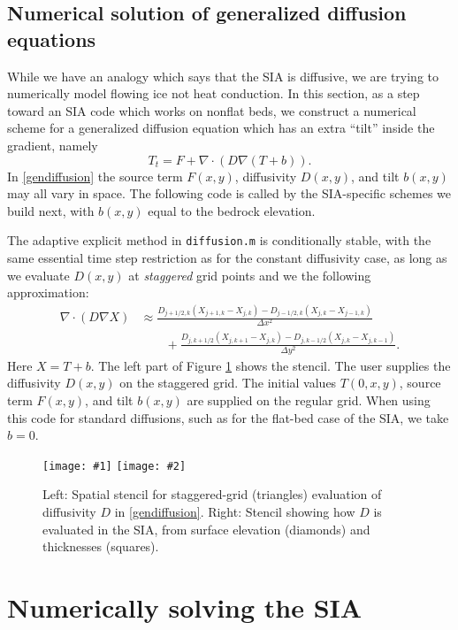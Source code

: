 \documentclass[letterpaper,final,12pt,reqno]{amsart}
\newcommand{\grad}{\nabla}
\newcommand{\Div}{\nabla\cdot}
\newcommand{\minput}[1]{
\vspace{0.8cm}
\VerbatimInput[frame=single,framesep=3mm,label=\fbox{\normalsize \textsl{\,#1.m\,}},fontfamily=courier,fontsize=\footnotesize]{tmp/#1.slim.m}
\vspace{0.5cm}
}
\newcommand{\twofigsizes}[5]{
\begin{figure}[ht]
\centering
\texttt{[image: \#1]} \quad
\texttt{[image: \#2]}
\caption{#3}
\label{fig:#1}
\end{figure}}
\begin{document}
\subsection*{Numerical solution of generalized diffusion equations}  While we have an analogy which says that the SIA is diffusive, we are trying to numerically model flowing ice not heat conduction.  In this section, as a step toward an SIA code which works on nonflat beds, we construct a numerical scheme for a generalized diffusion equation which has an extra ``tilt'' inside the gradient, namely
\begin{equation}
  T_t = F + \Div \left(D \grad (T + b)\right). \label{gendiffusion}
\end{equation}
In \eqref{gendiffusion} the source term $F(x,y)$, diffusivity $D(x,y)$, and tilt $b(x,y)$ may all vary in space.  The following code is called by the SIA-specific schemes we build next, with $b(x,y)$ equal to the bedrock elevation.

\minput{diffusion}

The adaptive explicit method in \texttt{diffusion.m} is conditionally stable, with the same essential time step restriction as for the constant diffusivity case, as long as we evaluate $D(x,y)$ at \emph{staggered} grid points and we the following approximation:
\begin{align*}
\Div \left(D \grad X\right) &\approx \frac{D_{j+1/2,k}(X_{j+1,k} - X_{j,k}) - D_{j-1/2,k}(X_{j,k} - X_{j-1,k})}{\Delta x^2} \\
	&\qquad + \frac{D_{j,k+1/2}(X_{j,k+1} - X_{j,k}) - D_{j,k-1/2}(X_{j,k} - X_{j,k-1})}{\Delta y^2}.
\end{align*}
Here $X=T+b$.  The left part of Figure \ref{fig:diffstencil} shows the stencil.  The user supplies the diffusivity $D(x,y)$ on the staggered grid.  The initial values $T(0,x,y)$, source term $F(x,y)$, and tilt $b(x,y)$ are supplied on the regular grid.  When using this code for standard diffusions, such as for the flat-bed case of the SIA, we take $b=0$.

\twofigsizes{diffstencil}{mahaffystencil}{Left:  Spatial stencil for staggered-grid (triangles) evaluation of diffusivity $D$ in \eqref{gendiffusion}.  Right: Stencil showing how $D$ is evaluated in the SIA, from surface elevation (diamonds) and thicknesses (squares).}{2.2in}{2.2in}


\section{Numerically solving the SIA} \label{sec:numericalsia}
\end{document}

